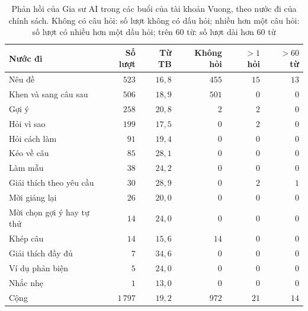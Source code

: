 \begin{table}[H]
\centering
\caption{Phản hồi của Gia sư AI trong các buổi của tài khoản Vuong, theo nước đi của chính sách. Không có câu hỏi: số lượt không có dấu hỏi; nhiều hơn một câu hỏi: số lượt có nhiều hơn một dấu hỏi; trên $60$ từ: số lượt dài hơn $60$ từ}\label{tab:db-socratic}
\small
\begin{tabular}{lrrrrr}
\toprule
Nước đi & Số lượt & Từ TB & Không hỏi & $>1$ hỏi & $>60$ từ \\
\midrule
Nêu đề & $523$ & $16{,}8$ & $455$ & $15$ & $13$ \\
Khen và sang câu sau & $506$ & $18{,}9$ & $501$ & $0$ & $0$ \\
Gợi ý & $258$ & $20{,}8$ & $2$ & $2$ & $0$ \\
Hỏi vì sao & $199$ & $17{,}5$ & $0$ & $2$ & $0$ \\
Hỏi cách làm & $91$ & $19{,}4$ & $0$ & $0$ & $0$ \\
Kéo về câu & $85$ & $28{,}1$ & $0$ & $0$ & $0$ \\
Làm mẫu & $38$ & $24{,}2$ & $0$ & $0$ & $0$ \\
Giải thích theo yêu cầu & $30$ & $28{,}9$ & $0$ & $2$ & $1$ \\
Mời giảng lại & $26$ & $20{,}0$ & $0$ & $0$ & $0$ \\
Mời chọn gợi ý hay tự thử & $14$ & $24{,}0$ & $0$ & $0$ & $0$ \\
Khép câu & $14$ & $15{,}6$ & $14$ & $0$ & $0$ \\
Giải thích đầy đủ & $7$ & $34{,}6$ & $0$ & $0$ & $0$ \\
Ví dụ phản biện & $5$ & $24{,}0$ & $0$ & $0$ & $0$ \\
Nhắc nhẹ & $1$ & $13{,}0$ & $0$ & $0$ & $0$ \\
\midrule
Cộng & $1\,797$ & $19{,}2$ & $972$ & $21$ & $14$ \\
\bottomrule
\end{tabular}
\end{table}
